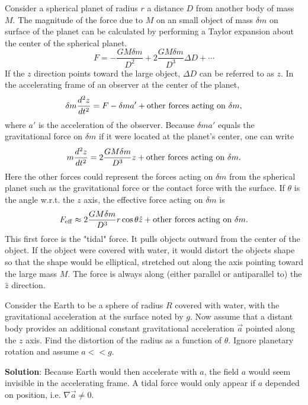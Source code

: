 Consider a spherical planet of radius $r$ a distance $D$ from another body of mass $M$. The magnitude of the force due to $M$ on an small object of mass $\delta m$ on surface of the planet can be calculated by performing a Taylor expansion about the center of the spherical planet.
\begin{equation}
F=-\frac{GM\delta m}{D^2}+2\frac{GM\delta m}{D^3}\Delta D+\cdots
\end{equation}
If the $z$ direction points toward the large object, $\Delta D$ can be referred to as $z$. In the accelerating frame of an observer at the center of the planet,
\begin{equation}
\delta m\frac{d^2 z}{dt^2}=F-\delta ma'+{\rm other~forces~acting~on~} \delta m,
\end{equation}
where $a'$ is the acceleration of the observer. Because $\delta ma'$ equals the gravitational force on $\delta m$ if it were located at the planet's center, one can write
\begin{equation}
m\frac{d^2z}{dt^2}=2\frac{GM\delta m}{D^3}z+{\rm other~forces~acting~on~}\delta m.
\end{equation}
Here the other forces could represent the forces acting on $\delta m$ from the spherical planet such as the gravitational force or the contact force with the surface. If $\theta$ is the angle w.r.t. the $z$ axis, the effective force acting on $\delta m$ is
\begin{equation}
F_{\rm eff}\approx 2\frac{GM\delta m}{D^3}r\cos\theta\hat{z}+{\rm other~forces~acting~on~}\delta m.
\end{equation}
This first force is the "tidal" force. It pulls objects outward from the center of the object. If the object were covered with water, it would distort the objects shape so that the shape would be elliptical, stretched out along the axis pointing toward the large mass $M$. The force is always along (either parallel or antiparallel to) the $\hat{z}$ direction.

\begin{samepage}

\example
Consider the Earth to be a sphere of radius $R$ covered with water, with the gravitational acceleration at the surface noted by $g$. Now assume that a distant body provides an additional constant gravitational acceleration $\vec{a}$ pointed along the $z$ axis. Find the distortion of the radius as a function of $\theta$. Ignore planetary rotation and assume $a<<g$.

{\bf Solution}: Because Earth would then accelerate with $a$, the field $a$ would seem invisible in the accelerating frame. A tidal force would only appear if $a$ depended on position, i.e. $\nabla \vec{a}\ne 0$.
\end{samepage}


